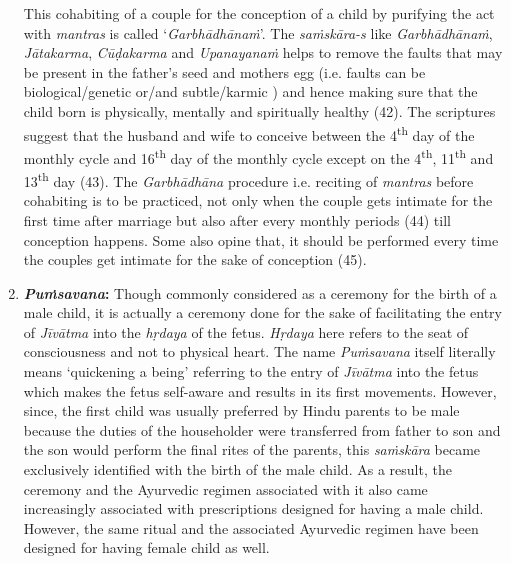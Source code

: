 \begin{enumerate}
  This cohabiting of a couple for the conception of a child by purifying the act with \emph{mantras} is called `\emph{Garbhādhānaṁ}'. The \emph{saṁskāra-s} like \emph{Garbhādhānaṁ}, \emph{Jātakarma}, \emph{Cūḍakarma} and \emph{Upanayanaṁ} helps to remove the faults that may be present in the father's seed and mothers egg (i.e. faults can be biological/genetic or/and subtle/karmic ) and hence making sure that the child born is physically, mentally and spiritually healthy (42). The scriptures suggest that the husband and wife to conceive between the 4\textsuperscript{th} day of the monthly cycle and 16\textsuperscript{th} day of the monthly cycle except on the 4\textsuperscript{th}, 11\textsuperscript{th} and 13\textsuperscript{th} day (43). The \emph{Garbhādhāna} procedure i.e. reciting of \emph{mantras} before cohabiting is to be practiced, not only when the couple gets intimate for the first time after marriage but also after every monthly periods (44) till conception happens. Some also opine that, it should be performed every time the couples get intimate for the sake of conception (45).
\item
  \textbf{\emph{Puṁsavana}:} Though commonly considered as a ceremony for the birth of a male child, it is actually a ceremony done for the sake of facilitating the entry of \emph{Jīvātma} into the \emph{hṛdaya} of the fetus. \emph{Hṛdaya} here refers to the seat of consciousness and not to physical heart. The name \emph{Puṁsavana} itself literally means `quickening a being' referring to the entry of \emph{Jīvātma} into the fetus which makes the fetus self-aware and results in its first movements. However, since, the first child was usually preferred by Hindu parents to be male because the duties of the householder were transferred from father to son and the son would perform the final rites of the parents, this \emph{saṁskāra} became exclusively identified with the birth of the male child. As a result, the ceremony and the Ayurvedic regimen associated with it also came increasingly associated with prescriptions designed for having a male child. However, the same ritual and the associated Ayurvedic regimen have been designed for having female child as well.


\end{enumerate}

